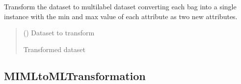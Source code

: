 \documentclass[letterpaper,10pt,english]{sphinxmanual}
\begin{document}
\begin{fulllineitems}
\begin{fulllineitems}
\end{fulllineitems}


\begin{fulllineitems}
\label{\detokenize{transformation/mimlTOml/_autosummary/miml.transformation.mimlTOml.minmax.MinMaxTransformation:miml.transformation.mimlTOml.minmax.MinMaxTransformation.transform_dataset}}
\pysigstartsignatures
\pysiglinewithargsret
{}
{}
{}
\pysigstopsignatures
\sphinxAtStartPar
Transform the dataset to multilabel dataset converting each bag into a single instance with the min and max
value of each attribute as two new attributes.
\begin{quote}\begin{description}
\sphinxAtStartPar
{} ({\hyperref[\detokenize{data/_autosummary/miml.data.miml_dataset.MIMLDataset:miml.data.miml_dataset.MIMLDataset}]{}}) \textendash{} Dataset to transform

\sphinxAtStartPar
{} \textendash{} Transformed dataset

\sphinxAtStartPar
{\hyperref[\detokenize{data/_autosummary/miml.data.miml_dataset.MIMLDataset:miml.data.miml_dataset.MIMLDataset}]{}}

\end{description}\end{quote}

\end{fulllineitems}


\end{fulllineitems}


\sphinxstepscope


\subsection{MIMLtoMLTransformation}
\label{\detokenize{transformation/mimlTOml/mimltomltransformation:mimltomltransformation}}\label{\detokenize{transformation/mimlTOml/mimltomltransformation::doc}}
\end{document}
